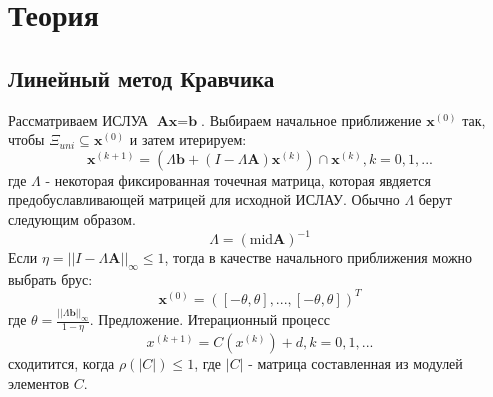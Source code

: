 \documentclass[a4paper,12pt]{article}
\begin{document}
    \section{Теория}
    \subsection{Линейный метод Кравчика}
    Рассматриваем ИСЛУА $ \textbf{Ax} = \textbf{b} $.\newline
    Выбираем начальное приближение $ \textbf{x}^{(0)} $ так, чтобы $ \varXi_{uni} \subseteq \textbf{x}^{(0)} $
    и затем итерируем:
    \begin{equation}
        \textbf{x}^{(k+1)} = (\Lambda\textbf{b} + (I - \Lambda\textbf{A})\textbf{x}^{(k)}) \cap \textbf{x}^{(k)}, k = 0, 1, ... 
        \label{eq:Krawczyk}
    \end{equation}
    где $ \Lambda $ - некоторая фиксированная точечная матрица, которая явдяется предобуславливающей матрицей для исходной ИСЛАУ.\newline
    Обычно $ \Lambda $ берут следующим образом.
    \begin{equation}
        \Lambda = (\text{mid}\textbf{A})^{-1}
    \end{equation}
    Если $ \eta = || I - \Lambda\textbf{A} ||_{\infty} \leq 1 $, тогда в качестве начального приближения можно выбрать брус:
    \begin{equation}
        \textbf{x}^{(0)} = ([-\theta, \theta], ..., [-\theta, \theta])^{T}
        \label{eq:boxapprox}
    \end{equation}
    где $ \theta = \frac{|| \Lambda\textbf{b} ||_{\infty}}{1 - \eta} $.\newline
    Предложение.
    Итерационный процесс
    \begin{equation}
        x^{(k+1)} = C(x^{(k)}) + d, k = 0, 1, ...
    \end{equation}
    сходитится, когда $ \rho(|C|) \leq 1 $, где $ |C| $ - матрица составленная из модулей элементов $ C $.
    
\end{document}
